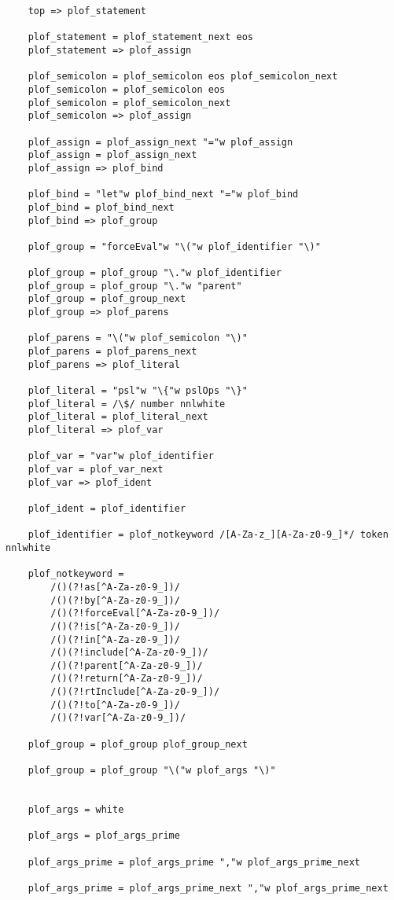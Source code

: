 \begin{verbatim}
    top => plof_statement

    plof_statement = plof_statement_next eos
    plof_statement => plof_assign

    plof_semicolon = plof_semicolon eos plof_semicolon_next
    plof_semicolon = plof_semicolon eos
    plof_semicolon = plof_semicolon_next
    plof_semicolon => plof_assign

    plof_assign = plof_assign_next "="w plof_assign
    plof_assign = plof_assign_next
    plof_assign => plof_bind

    plof_bind = "let"w plof_bind_next "="w plof_bind
    plof_bind = plof_bind_next
    plof_bind => plof_group

    plof_group = "forceEval"w "\("w plof_identifier "\)"

    plof_group = plof_group "\."w plof_identifier
    plof_group = plof_group "\."w "parent"
    plof_group = plof_group_next
    plof_group => plof_parens

    plof_parens = "\("w plof_semicolon "\)"
    plof_parens = plof_parens_next
    plof_parens => plof_literal

    plof_literal = "psl"w "\{"w pslOps "\}"
    plof_literal = /\$/ number nnlwhite
    plof_literal = plof_literal_next
    plof_literal => plof_var

    plof_var = "var"w plof_identifier
    plof_var = plof_var_next
    plof_var => plof_ident

    plof_ident = plof_identifier

    plof_identifier = plof_notkeyword /[A-Za-z_][A-Za-z0-9_]*/ token nnlwhite

    plof_notkeyword =
        /()(?!as[^A-Za-z0-9_])/
        /()(?!by[^A-Za-z0-9_])/
        /()(?!forceEval[^A-Za-z0-9_])/
        /()(?!is[^A-Za-z0-9_])/
        /()(?!in[^A-Za-z0-9_])/
        /()(?!include[^A-Za-z0-9_])/
        /()(?!parent[^A-Za-z0-9_])/
        /()(?!return[^A-Za-z0-9_])/
        /()(?!rtInclude[^A-Za-z0-9_])/
        /()(?!to[^A-Za-z0-9_])/
        /()(?!var[^A-Za-z0-9_])/

    plof_group = plof_group plof_group_next

    plof_group = plof_group "\("w plof_args "\)"


    plof_args = white

    plof_args = plof_args_prime

    plof_args_prime = plof_args_prime ","w plof_args_prime_next

    plof_args_prime = plof_args_prime_next ","w plof_args_prime_next


\end{verbatim}
